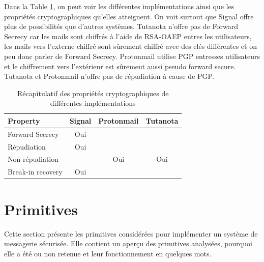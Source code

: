 Dans la Table \ref{tab:recapProps}, on peut voir les différentes implémentations ainsi que les propriétés cryptographiques qu'elles atteignent. On voit surtout que Signal offre plus de possibilités que d'autres systèmes. Tutanota n'offre pas de Forward Secrecy car les mails sont chiffrés à l'aide de RSA-OAEP entres les utilisateurs, les mails vers l'externe chiffré sont sûrement chiffré avec des clés différentes et on peu donc parler de Forward Secrecy. Protonmail utilise PGP entresses utilisateurs et le chiffrement vers l'extérieur est sûrement aussi pseudo forward secure. Tutanota et Protonmail n'offre pas de répudiation à cause de PGP.
\begin{table}[]
	\centering
	\begin{tabular}{|lccc|}
		\hline
		Property          & Signal & Protonmail & Tutanota \\ \hline
		Forward Secrecy   & Oui    &            &          \\
		Répudiation       & Oui    &            &          \\
		Non répudiation   &        & Oui        & Oui      \\
		Break-in recovery & Oui    &            &          \\ \hline
	\end{tabular}
	\caption{Récapitulatif des propriétés cryptographiques de différentes implémentations}
	\label{tab:recapProps}
\end{table}
\section{Primitives}
Cette section présente les primitives considérées pour implémenter un système de messagerie sécurisée. Elle contient un aperçu des primitives analysées, pourquoi elle a été ou non retenue et leur fonctionnement en quelques mots.
